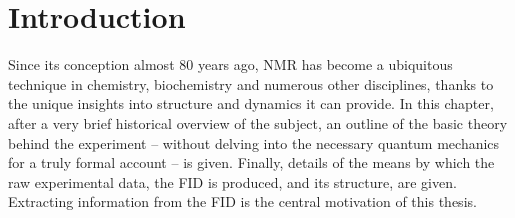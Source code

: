 \chapter{Introduction}

Since its conception almost 80 years ago, \ac{NMR} has become a ubiquitous
technique in chemistry, biochemistry and numerous other disciplines, thanks to
the unique insights into structure and dynamics it can provide. In this
chapter, after a very brief historical overview of the subject, an outline of
the basic theory behind the experiment -- without delving into the necessary
quantum mechanics for a truly formal account -- is given. Finally, details of
the means by which the raw experimental data, the \ac*{FID} is produced, and its
structure, are given. Extracting information from the \acs{FID} is the central
motivation of this thesis.



